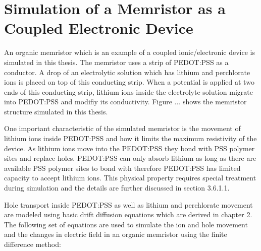 

\chapter{Simulation of a Memristor as a Coupled Electronic Device} %

\label{Chapter4} %

\begin{doublespace}

An organic memristor which is an example of a coupled ionic/electronic device is simulated in this thesis. The memristor uses a strip of PEDOT:PSS as a conductor. A drop of an electrolytic solution which has lithium and perchlorate ions is placed on top of this conducting strip. When a potential is applied at two ends of this conducting strip, lithium ions inside the electrolyte solution migrate into PEDOT:PSS and modifiy its conductivity. Figure ... shows the memristor structure simulated in this thesis.


One important characteristic of the simulated memristor is the movement of lithium ions inside PEDOT:PSS and how it limits the maximum resistivity of the device. As lithium ions move into the PEDOT:PSS they bond with PSS polymer sites and replace holes. PEDOT:PSS can only absorb lithium as long as there are available PSS polymer sites to bond with therefore PEDOT:PSS has limited capacity to accept lithium ions. This physical property requires special treatment during simulation and the details are further discussed in section 3.6.1.1. 

Hole transport inside PEDOT:PSS as well as lithium and perchlorate movement are modeled using basic drift diffusion equations which are derived in chapter 2. The following set of equations are used to simulate the ion and hole movement and the changes in electric field in an organic memristor using the finite difference method:


\end{doublespace}
